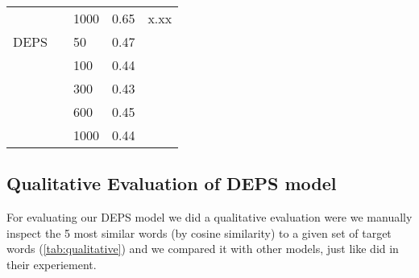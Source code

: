 \begin{table}[]
\begin{minipage}{.65\textwidth}
\begin{tabular}{@{}lllll@{}}
                        &               & 1000 & 0.65             & x.xx            \\ \cmidrule(r){1-5}
    DEPS                &               & 50   & 0.47             \\
                        &               & 100  & 0.44             \\
                        &               & 300  & 0.43             \\
                        &               & 600  & 0.45             \\
                        &               & 1000 & 0.44             \\ \cmidrule(r){1-5}
    \end{tabular}
    \end{minipage}
    \end{table}


\subsection{Qualitative Evaluation of DEPS model}\label{chap:results:qualitative}

For evaluating our DEPS model we did a qualitative evaluation were we manually inspect the 5 most similar words (by cosine similarity) to a given set of target words (\autoref{tab:qualitative}) and we compared it with other models, just like  did in their experiement.



